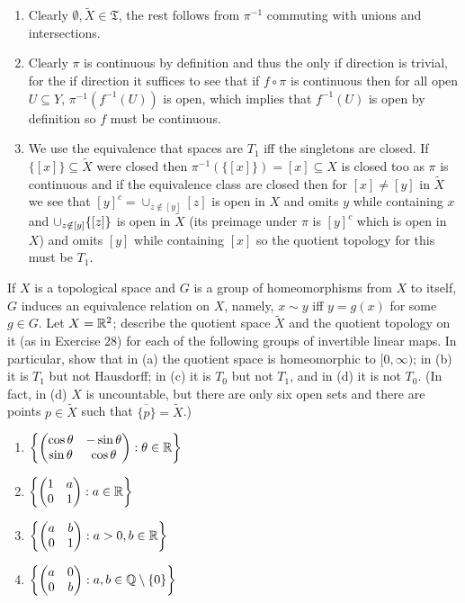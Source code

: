 \documentclass[12pt,a4paper]{article}
\begin{document}
\begin{solution}
\begin{enumerate}[label=\alph*.]
    \item Clearly $\emptyset,\tilde{X}\in\mathfrak T$, the rest follows from $\pi^{-1}$ commuting with unions and intersections. 
    \item Clearly $\pi$ is continuous by definition and thus the only if direction is trivial, for the if direction it suffices to see that if $f\circ\pi$ is continuous then for all open $U \subseteq Y$, $\pi^{-1}(f^{-1}(U))$ is open, which implies that $f^{-1}(U)$ is open by definition so $f$ must be continuous. 
    \item We use the equivalence that spaces are $T_1$ iff the singletons are closed. 
        If $\{[x]\}\subseteq\tilde{X}$ were closed then $\pi^{-1}(\{[x]\})=[x]\subseteq X$ is closed too as $\pi$ is continuous and if the equivalence class are closed then for $[x]\neq[y]$ in $\tilde{X}$ we see that $[y]^c=\cup_{z\notin[y]}[z]$ is open in $X$ and omits $y$ while containing $x$ and $\cup_{z\notin[y]} \qty{[z]}$ is open in $\tilde{X}$ (its preimage under $\pi$ is $[y]^c$ which is open in $X$) and omits $[y]$ while containing $[x]$ so the quotient topology for this must be $T_1.$ 
\end{enumerate}
\end{solution}
\begin{problem}\label{prob:4-29}
If $X$ is a topological space and $G$ is a group of homeomorphisms from $X$ to itself, $G$ induces an equivalence relation on $X$, namely, $x \sim y$ iff $y = g(x)$ for some $g \in G$. Let $X = \mathbb{R}^2$; describe the quotient space $\tilde{X}$ and the quotient topology on it (as in Exercise 28) for each of the following groups of invertible linear maps. In particular, show that in (a) the quotient space is homeomorphic to $[0,\infty)$; in (b) it is $T_1$ but not Hausdorff; in (c) it is $T_0$ but not $T_1$, and in (d) it is not $T_0$. (In fact, in (d) $X$ is uncountable, but there are only six open sets and there are points $p \in \tilde{X}$ such that $\overline{\{p\}} = \tilde{X}$.)
\begin{enumerate}[label=\alph*.]
    \item $\left\{ \begin{pmatrix} \cos \theta & -\sin \theta \\ \sin \theta & \cos \theta \end{pmatrix} : \theta \in \mathbb{R} \right\}$
    \item $\left\{ \begin{pmatrix} 1 & a \\ 0 & 1 \end{pmatrix} : a \in \mathbb{R} \right\}$
    \item $\left\{ \begin{pmatrix} a & b \\ 0 & 1 \end{pmatrix} : a > 0, b \in \mathbb{R} \right\}$
    \item $\left\{ \begin{pmatrix} a & 0 \\ 0 & b \end{pmatrix} : a, b \in \mathbb{Q} \setminus \{0\} \right\}$
\end{enumerate}
\end{problem}
\end{document}

